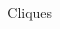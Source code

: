 \begin{minipage}[t]{\textwidth}
    \begin{columns}
        \begin{column}{0.5\textwidth}
            \begin{columns}
                \begin{column}{0.6\textwidth}
                    \begin{flushright}
                    \resizebox{0.9\textwidth}{!}{}
                    \end{flushright}
                \end{column}
                \begin{column}{0.4\textwidth}
                    Cliques
                \end{column}
            \end{columns}
        \end{column}
    \hfill
        \begin{column}{0.5\textwidth}
        \end{column}
    \end{columns}
\end{minipage}